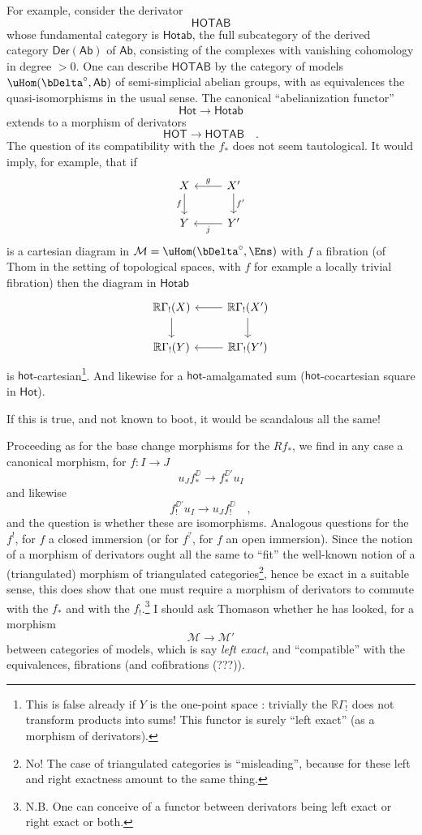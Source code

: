 \noindent{}For example, consider the derivator
\[
\mathsf{HOTAB}
\]
whose fundamental category is $\mathsf{Hotab}$, the full subcategory of the derived category $\mathsf{Der}(\mathsf{Ab})$ of $\mathsf{Ab}$, consisting of the complexes with vanishing cohomology in degree $> 0$. One can describe $\mathsf{HOTAB}$ by the category of models $\uHom(\bDelta^\circ,\mathsf{Ab})$ of semi-simplicial abelian groups, with as equivalences the quasi-isomorphisms in the usual sense. The canonical ``abelianization functor''
\[
\mathsf{Hot} \longrightarrow \mathsf{Hotab}
\]
extends to a morphism of derivators
\[
\mathsf{HOT} \longrightarrow \mathsf{HOTAB} \quad .
\]
The question of its compatibility with the $f_*$ does not seem tautological. It would imply, for example, that if
\[
\begin{tikzcd}
X \arrow[d, "f"'] & X' \arrow[l, "g"'] \arrow[d, "f'"] \\
Y & Y' \arrow[l, "j"]
\end{tikzcd}
\]
is a cartesian diagram in $\mathcal{M} = \uHom(\bDelta^\circ,\Ens)$ with $f$ a fibration (of Thom in the setting of topological spaces, with $f$ for example a locally trivial fibration) then the diagram in $\mathsf{Hotab}$
\[
\begin{tikzcd}
\mathbb{R}\Gamma_!(X) \arrow[d] & \mathbb{R}\Gamma_!(X') \arrow[l] \arrow[d] \\
\mathbb{R}\Gamma_!(Y) & \mathbb{R}\Gamma_!(Y') \arrow[l]
\end{tikzcd}
\]
is $\mathsf{hot}$-cartesian\footnote[7]{This is false already if $Y$ is the one-point space : trivially the $\mathbb{R}\Gamma_!$ does not transform products into sums! This functor is surely ``left exact'' (as a morphism of derivators).}. And likewise for a $\mathsf{hot}$-amalgamated sum ($\mathsf{hot}$-cocartesian square in $\mathsf{Hot}$). %

\noindent{}If this is true, and not known to boot, it would be scandalous all the same!

Proceeding as for the base change morphisms for the $Rf_*$, we find in any case a canonical morphism, for $f : I \to J$
\[
u_Jf_*^{\DD} \longrightarrow f_*^{\DD'}u_I
\]
%
and likewise
\[
f_!^{\DD'}u_I \longrightarrow u_Jf_!^{\DD} \quad ,
\]
and the question is whether these are isomorphisms. Analogous questions for the $f^!$, for $f$ a closed immersion (or for $f^?$, for $f$ an open immersion). Since the notion of a morphism of derivators ought all the same to ``fit'' the well-known notion of a (triangulated) morphism of triangulated categories\footnote[8]{No! The case of triangulated categories is ``misleading'', because for these left and right exactness amount to the same thing.}, hence be exact in a suitable sense, this does show that one must require a morphism of derivators to commute with the $f_*$ and with the $f_!$.\footnote[9]{N.B. One can conceive of a functor between derivators being left exact or right exact or both.} I should ask Thomason whether he has looked, for a morphism
\[
\mathcal{M} \longrightarrow \mathcal{M}'
\]
between categories of models, which is say \textit{left exact}, and ``compatible'' with the equivalences, fibrations (and cofibrations (???)).

